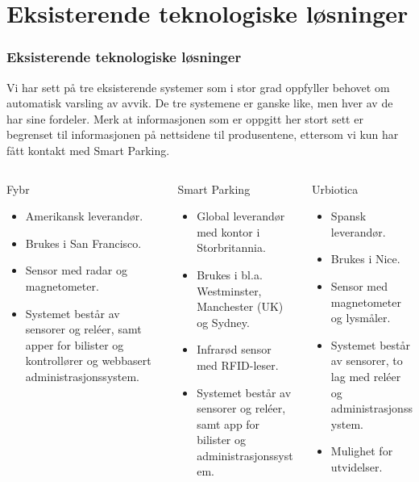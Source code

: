 \documentclass[xetex]{beamer}
\begin{document}
\begin{frame}\label{fr:eksiterende_losninger}
	\section{Eksisterende teknologiske løsninger}
	\frametitle{Eksisterende teknologiske løsninger}
	Vi har sett på tre eksisterende systemer som i stor grad oppfyller behovet om automatisk varsling av avvik. De tre systemene er ganske like, men hver av de har sine fordeler. Merk at informasjonen som er oppgitt her stort sett er begrenset til informasjonen på nettsidene til produsentene, ettersom vi kun har fått kontakt med Smart Parking.
	\vspace{2em}
	
	\begin{columns}[T]
		\begin{column}{0.33\textwidth}
			{\footnotesize\alert{Fybr}}
			\begin{itemize}
				\item Amerikansk leverandør.
				\item Brukes i San Francisco.
				\item Sensor med \alert{radar og magnetometer}.
				\item Systemet består av sensorer og reléer, samt \alert{apper for bilister og kontrollører} og webbasert administrasjonssystem.
			\end{itemize}
		\end{column}
		\begin{column}{0.33\textwidth}
			{\footnotesize\alert{Smart Parking}}
			\begin{itemize}
				\item Global leverandør med kontor i Storbritannia.
				\item Brukes i bl.a. Westminster, Manchester (UK) og Sydney.
				\item Infrarød sensor med \alert{RFID-leser}.
				\item Systemet består av sensorer og reléer, samt app for bilister og administrasjonssystem.
			\end{itemize}
		\end{column}
		\begin{column}{0.33\textwidth}
			{\footnotesize\alert{Urbiotica}}
			\begin{itemize}
				\item Spansk leverandør.
				\item Brukes i Nice.
				\item Sensor med magnetometer og lysmåler.
				\item Systemet består av sensorer, to lag med reléer og administrasjonssystem.
				\item Mulighet for utvidelser.
			\end{itemize}
		\end{column}
	\end{columns}
	

\end{frame}
\end{document}
